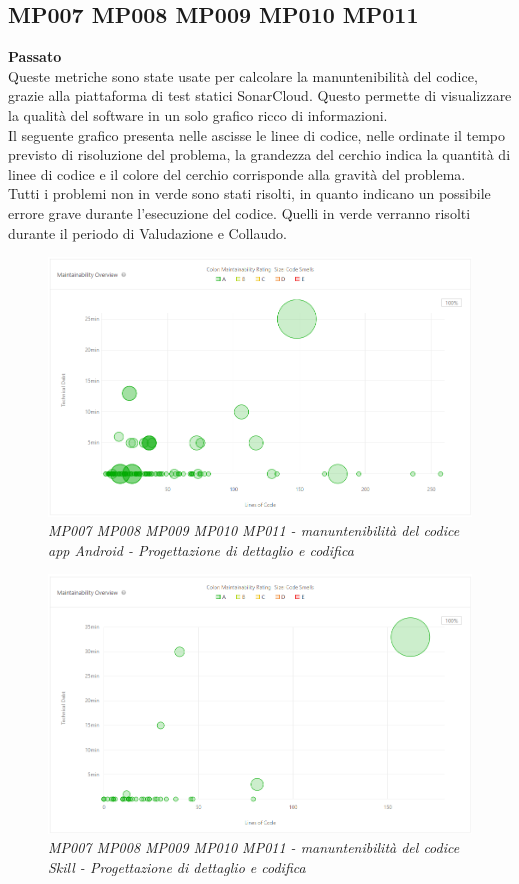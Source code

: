 \subsection{MP007 MP008 MP009 MP010 MP011 }
\textbf{Passato}\\
Queste metriche sono state usate per calcolare la manuntenibilità del codice, grazie alla piattaforma di test statici SonarCloud. Questo permette di visualizzare la qualità del software in un solo grafico ricco di informazioni.\\
Il seguente grafico presenta nelle ascisse le linee di codice, nelle ordinate il tempo previsto di risoluzione del problema, la grandezza del cerchio indica la quantità di linee di codice e il colore del cerchio corrisponde alla gravità del problema.\\
Tutti i problemi non in verde sono stati risolti, in quanto indicano un possibile errore grave durante l'esecuzione del codice. Quelli in verde verranno risolti durante il periodo di Valudazione e Collaudo.\\
\begin{figure} [H]
    \centering
	\includegraphics[scale=0.5]{./images/manPDC.png}
    \caption{\textit{MP007 MP008 MP009 MP010 MP011 - manuntenibilità del codice app Android - Progettazione di dettaglio e codifica}}\label{}
\end{figure}
\begin{figure} [H]
    \centering
	\includegraphics[scale=0.5]{./images/manSPDC.png}
    \caption{\textit{MP007 MP008 MP009 MP010 MP011 - manuntenibilità del codice Skill - Progettazione di dettaglio e codifica}}\label{}
\end{figure}

